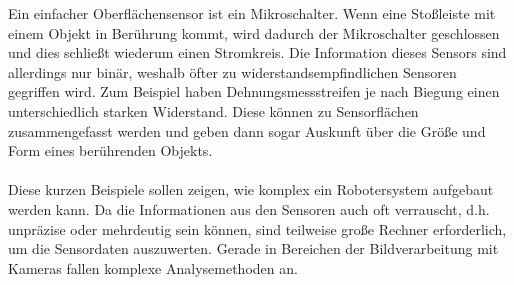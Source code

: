 Ein einfacher Oberflächensensor ist ein Mikroschalter. Wenn eine Stoßleiste mit einem Objekt in Berührung kommt, wird dadurch der Mikroschalter geschlossen und dies schließt wiederum einen Stromkreis. Die Information dieses Sensors sind allerdings nur binär, weshalb öfter zu widerstandsempfindlichen Sensoren gegriffen wird. Zum Beispiel haben Dehnungsmessstreifen je nach Biegung einen unterschiedlich starken Widerstand. Diese können zu Sensorflächen zusammengefasst werden und geben dann sogar Auskunft über die Größe und Form eines berührenden Objekts.
\\
\\
\noindent
Diese kurzen Beispiele sollen zeigen, wie komplex ein Robotersystem aufgebaut werden kann. Da die Informationen aus den Sensoren auch oft verrauscht, d.h. unpräzise oder mehrdeutig sein können, sind teilweise große Rechner erforderlich, um die Sensordaten auszuwerten. Gerade in Bereichen der Bildverarbeitung mit Kameras fallen komplexe Analysemethoden an.